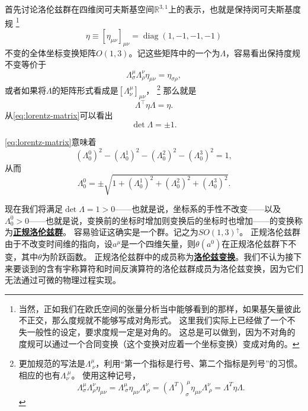 \documentclass[hyperref, UTF8, a4paper]{ctexart}
\DeclareMathOperator{\diag}{diag}
\newcommand*{\reals}{\mathbb{R}}
\newcommand{\concept}[1]{\underline{\textbf{#1}}}
\begin{document}
首先讨论洛伦兹群在四维闵可夫斯基空间$\reals^{3, 1}$上的表示，也就是保持闵可夫斯基度规%
\footnote{当然，正如我们在欧氏空间的张量分析当中能够看到的那样，如果基矢量彼此不正交，那么度规就不能够写成对角形式。
这里我们实际上已经做了一个不失一般性的设定，要求度规一定是对角的。
这总是可以做到，因为不对角的度规可以通过一个合同变换（这个变换对应着一个坐标变换）变成对角的。}%
\begin{equation}
    \eta \equiv [\eta_{\mu \nu}]_{\mu \nu} = \diag (1, -1, -1, -1)
\end{equation}
不变的全体坐标变换矩阵$O(1,3)$。记这些矩阵中的一个为$\Lambda$，容易看出保持度规不变等价于
\begin{equation}
    \Lambda_\sigma^\mu \Lambda_\rho^\nu \eta_{\mu \nu} = \eta_{\sigma \rho},
\end{equation}
或者如果将$\Lambda$的矩阵形式看成是$[\Lambda^\mu_\nu]_{\mu \nu}$，%
\footnote{更加规范的写法是$\Lambda^\mu_{\ \nu}$，利用“第一个指标是行号、第二个指标是列号”的习惯。相应的也有$\Lambda_{\nu}^{\ \mu}$。
使用这种记号，
\[
    \Lambda_\sigma^\mu \Lambda_\rho^\nu \eta_{\mu \nu} = \Lambda_{\ \sigma}^\mu \eta_{\mu \nu} \Lambda_{\ \rho}^\nu = (\Lambda^T)_\sigma^{\ \mu} \eta_{\mu \nu} \Lambda_{\ \rho}^\nu = \Lambda^T \eta \Lambda.
\]
}%
那么就是
\begin{equation}
    \Lambda^\top \eta \Lambda = \eta.
    \label{eq:lorentz-matrix}
\end{equation}
从\eqref{eq:lorentz-matrix}可以看出
\begin{equation}
    \det \Lambda = \pm 1. 
    \label{eq:det-lorentz}
\end{equation}

\eqref{eq:lorentz-matrix}意味着
\[
    (\Lambda_0^0)^2 - (\Lambda_0^1)^2 - (\Lambda_0^2)^2 - (\Lambda_0^3)^2 = 1,
\]
从而
\begin{equation}
    \Lambda_0^0 = \pm \sqrt{1 + (\Lambda_0^1)^2 + (\Lambda_0^2)^2 + (\Lambda_0^3)^2}.
\end{equation}

现在我们将满足$\det \Lambda = 1 > 0$——也就是说，坐标系的手性不改变——以及$\Lambda_0^0 > 0$——也就是说，变换前的坐标时增加则变换后的坐标时也增加——的变换称为\concept{正规洛伦兹群}。
容易验证这确实是一个群。记之为$SO(1,3)^\uparrow$。
正规洛伦兹群由于不改变时间维的指向，设$a^\mu$是一个四维矢量，则$\theta(a^0)$在正规洛伦兹群下不变，其中$\theta$为阶跃函数。
正规洛伦兹群中的成员称为\concept{洛伦兹变换}。我们不认为接下来要谈到的含有宇称算符和时间反演算符的洛伦兹群成员为洛伦兹变换，因为它们无法通过可微的物理过程实现。
\end{document}
